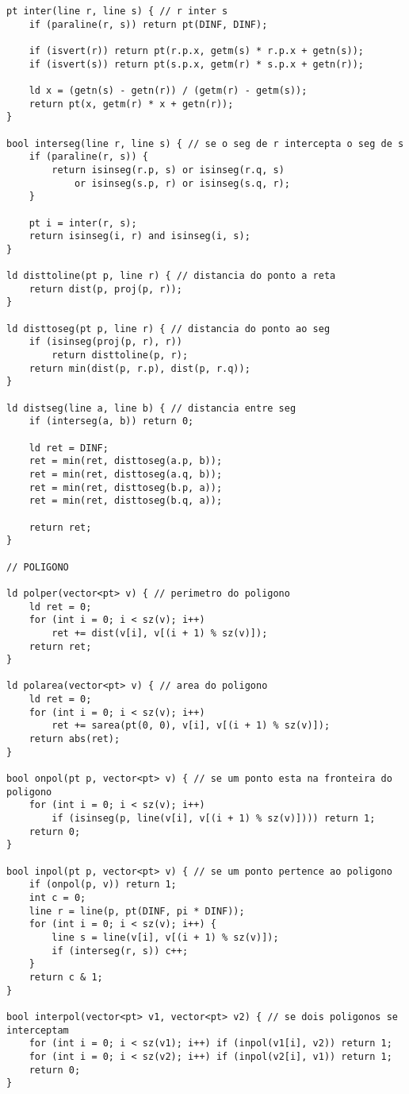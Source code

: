 \documentclass[12pt, a4paper, twoside]{article}
\begin{document}
\begin{lstlisting}
pt inter(line r, line s) { // r inter s
	if (paraline(r, s)) return pt(DINF, DINF);

	if (isvert(r)) return pt(r.p.x, getm(s) * r.p.x + getn(s));
	if (isvert(s)) return pt(s.p.x, getm(r) * s.p.x + getn(r));

	ld x = (getn(s) - getn(r)) / (getm(r) - getm(s));
	return pt(x, getm(r) * x + getn(r));
}

bool interseg(line r, line s) { // se o seg de r intercepta o seg de s
	if (paraline(r, s)) {
		return isinseg(r.p, s) or isinseg(r.q, s)
			or isinseg(s.p, r) or isinseg(s.q, r);
	}

	pt i = inter(r, s);
	return isinseg(i, r) and isinseg(i, s);
}

ld disttoline(pt p, line r) { // distancia do ponto a reta
	return dist(p, proj(p, r));
}

ld disttoseg(pt p, line r) { // distancia do ponto ao seg
	if (isinseg(proj(p, r), r))
		return disttoline(p, r);
	return min(dist(p, r.p), dist(p, r.q));
}

ld distseg(line a, line b) { // distancia entre seg
	if (interseg(a, b)) return 0;

	ld ret = DINF;
	ret = min(ret, disttoseg(a.p, b));
	ret = min(ret, disttoseg(a.q, b));
	ret = min(ret, disttoseg(b.p, a));
	ret = min(ret, disttoseg(b.q, a));

	return ret;
}

// POLIGONO

ld polper(vector<pt> v) { // perimetro do poligono
	ld ret = 0;
	for (int i = 0; i < sz(v); i++)
		ret += dist(v[i], v[(i + 1) % sz(v)]);
	return ret;
}

ld polarea(vector<pt> v) { // area do poligono
	ld ret = 0;
	for (int i = 0; i < sz(v); i++)
		ret += sarea(pt(0, 0), v[i], v[(i + 1) % sz(v)]);
	return abs(ret);
}

bool onpol(pt p, vector<pt> v) { // se um ponto esta na fronteira do poligono
	for (int i = 0; i < sz(v); i++)
		if (isinseg(p, line(v[i], v[(i + 1) % sz(v)]))) return 1;
	return 0;
}

bool inpol(pt p, vector<pt> v) { // se um ponto pertence ao poligono
	if (onpol(p, v)) return 1;
	int c = 0;
	line r = line(p, pt(DINF, pi * DINF));
	for (int i = 0; i < sz(v); i++) {
		line s = line(v[i], v[(i + 1) % sz(v)]);
		if (interseg(r, s)) c++;
	}
	return c & 1;
}

bool interpol(vector<pt> v1, vector<pt> v2) { // se dois poligonos se interceptam
	for (int i = 0; i < sz(v1); i++) if (inpol(v1[i], v2)) return 1;
	for (int i = 0; i < sz(v2); i++) if (inpol(v2[i], v1)) return 1;
	return 0;
}


\end{lstlisting}
\end{document}
